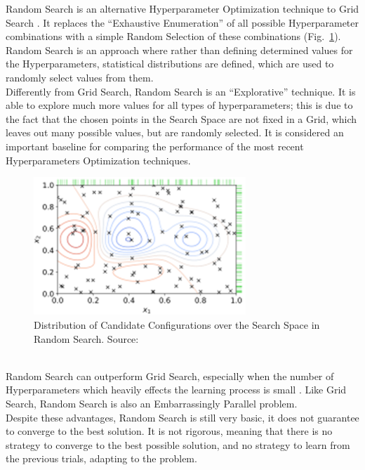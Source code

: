 Random Search is an alternative Hyperparameter Optimization technique to Grid Search \cite{OptunaSamplers-RandomSearch}.
It replaces the “Exhaustive Enumeration” of all possible Hyperparameter combinations with a simple Random Selection of these combinations (Fig.~\ref{fig:figure-2.2.4}).
\\[0.3cm]Random Search is an approach where rather than defining determined values for the Hyperparameters, statistical distributions are defined, which are used to randomly select values from them.
\\[0.3cm]Differently from Grid Search, Random Search is an “Explorative” technique. It is able to explore much more values for all types of hyperparameters; this is due to the fact that the chosen points in the Search Space are not fixed in a Grid, which leaves out many possible values, but are randomly selected.
It is considered an important baseline for comparing the performance of the most recent Hyperparameters Optimization techniques.
\begin{figure}[t]
	\centering
	\includegraphics[width=8cm]{figures/figure-2.2.4.png}
	\caption[Candidates Distribution in Random Search]{Distribution of Candidate Configurations over the Search Space in Random Search. Source:~\cite{Tesi-1.1}}
	\label{fig:figure-2.2.4}
\end{figure}	
% 
\\[0.3cm]Random Search can outperform Grid Search, especially when the number of Hyperparameters which heavily effects the learning process is small \cite{OptunaSamplers-RandomSearch}.
Like Grid Search, Random Search is also an Embarrassingly Parallel problem.
\\[0.3cm]Despite these advantages, Random Search is still very basic, it does not guarantee to converge to the best solution. It is not rigorous, meaning that there is no strategy to converge to the best possible solution, and no strategy to learn from the previous trials, adapting to the problem.
% 
